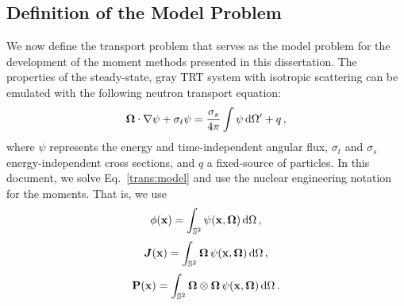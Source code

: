 \documentclass[../doc.tex]{subfiles}
\begin{document}
\subsection{Definition of the Model Problem}
We now define the transport problem that serves as the model problem for the development of the moment methods presented in this dissertation. The properties of the steady-state, gray TRT system with isotropic scattering can be emulated with the following neutron transport equation: 
	\begin{equation} \label{trans:model}
		\boldsymbol{\Omega}\cdot\nabla\psi + \sigma_t \psi = \frac{\sigma_s}{4\pi} \int \psi \mathop{}\!\mathrm{d} \Omega' + q \,,
	\end{equation}
where $\psi$ represents the energy and time-independent angular flux, $\sigma_t$ and $\sigma_s$ energy-independent cross sections, and $q$ a fixed-source of particles. In this document, we solve Eq.~\ref{trans:model} and use the nuclear engineering notation for the moments. That is, we use 
	\begin{equation}
		\phi(\boldsymbol{\mathrm{x}}) = \int_{\mathbb{S}^2} \psi(\boldsymbol{\mathrm{x}},\boldsymbol{\Omega}) \mathop{}\!\mathrm{d} \Omega \,,
	\end{equation}
	\begin{equation}
		\boldsymbol{J}(\boldsymbol{\mathrm{x}}) = \int_{\mathbb{S}^2} \boldsymbol{\Omega}\,\psi(\boldsymbol{\mathrm{x}},\boldsymbol{\Omega}) \mathop{}\!\mathrm{d} \Omega \,,
	\end{equation}
	\begin{equation}
		\boldsymbol{\mathrm{P}}(\boldsymbol{\mathrm{x}}) = \int_{\mathbb{S}^2} \boldsymbol{\Omega}\otimes\boldsymbol{\Omega}\,\psi(\boldsymbol{\mathrm{x}},\boldsymbol{\Omega})\mathop{}\!\mathrm{d}\Omega \,. 
	\end{equation}
\end{document}
